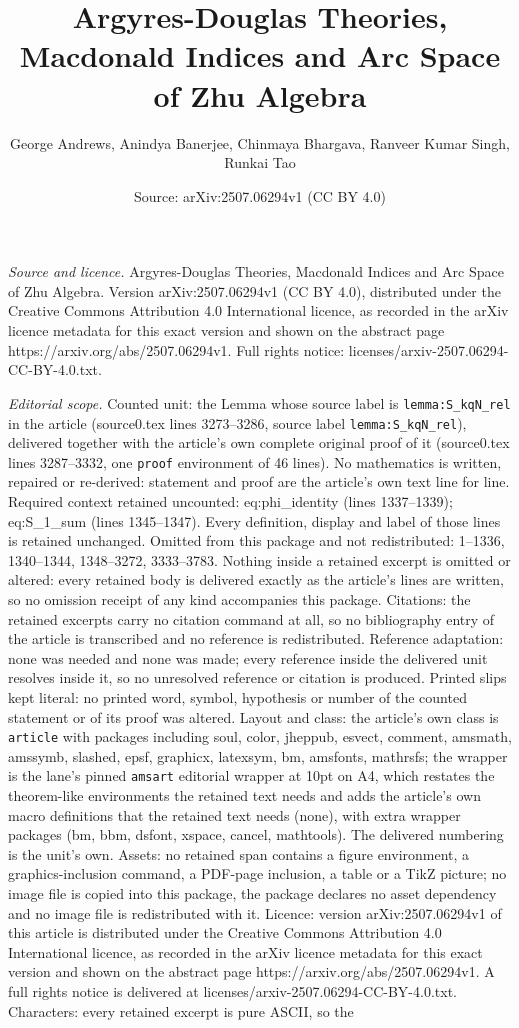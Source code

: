 \documentclass[10pt,a4paper]{amsart}
\title[Argyres-Douglas Theories, Macdonald Indices and Arc Space of]{Argyres-Douglas Theories, Macdonald Indices and Arc Space of Zhu Algebra}
\author{George Andrews, Anindya Banerjee, Chinmaya Bhargava, Ranveer Kumar Singh, Runkai Tao}
\date{Source: arXiv:2507.06294v1 (CC BY 4.0)}
\begin{document}
\maketitle

\noindent\emph{Source and licence.} Argyres-Douglas Theories, Macdonald Indices and Arc Space of Zhu Algebra. Version arXiv:2507.06294v1 (CC BY 4.0), distributed under the Creative Commons Attribution 4.0 International licence, as recorded in the arXiv licence metadata for this exact version and shown on the abstract page https://arxiv.org/abs/2507.06294v1. Full rights notice: licenses/arxiv-2507.06294-CC-BY-4.0.txt.\par\smallskip

\noindent\textit{Editorial scope.} Counted unit: the Lemma whose source label is \texttt{lemma:S\_kqN\_rel} in the article (source0.tex lines 3273--3286, source label \texttt{lemma:S\_kqN\_rel}), delivered together with the article's own complete original proof of it (source0.tex lines 3287--3332, one \texttt{proof} environment of 46 lines). No mathematics is written, repaired or re-derived: statement and proof are the article's own text line for line. Required context retained uncounted: eq:phi\_identity (lines 1337--1339); eq:S\_1\_sum (lines 1345--1347). Every definition, display and label of those lines is retained unchanged. Omitted from this package and not redistributed: 1--1336, 1340--1344, 1348--3272, 3333--3783. Nothing inside a retained excerpt is omitted or altered: every retained body is delivered exactly as the article's lines are written, so no omission receipt of any kind accompanies this package. Citations: the retained excerpts carry no citation command at all, so no bibliography entry of the article is transcribed and no reference is redistributed. Reference adaptation: none was needed and none was made; every reference inside the delivered unit resolves inside it, so no unresolved reference or citation is produced. Printed slips kept literal: no printed word, symbol, hypothesis or number of the counted statement or of its proof was altered. Layout and class: the article's own class is \texttt{article} with packages including soul, color, jheppub, esvect, comment, amsmath, amssymb, slashed, epsf, graphicx, latexsym, bm, amsfonts, mathrsfs; the wrapper is the lane's pinned \texttt{amsart} editorial wrapper at 10pt on A4, which restates the theorem-like environments the retained text needs and adds the article's own macro definitions that the retained text needs (none), with extra wrapper packages (bm, bbm, dsfont, xspace, cancel, mathtools). The delivered numbering is the unit's own. Assets: no retained span contains a figure environment, a graphics-inclusion command, a PDF-page inclusion, a table or a TikZ picture; no image file is copied into this package, the package declares no asset dependency and no image file is redistributed with it. Licence: version arXiv:2507.06294v1 of this article is distributed under the Creative Commons Attribution 4.0 International licence, as recorded in the arXiv licence metadata for this exact version and shown on the abstract page https://arxiv.org/abs/2507.06294v1. A full rights notice is delivered at licenses/arxiv-2507.06294-CC-BY-4.0.txt. Characters: every retained excerpt is pure ASCII, so the 
\end{document}

